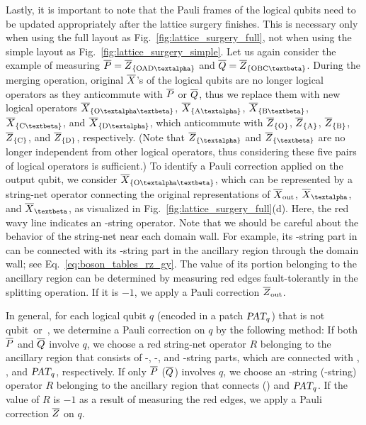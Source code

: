 \documentclass[
 prx,
 reprint,
 superscriptaddress,
 longbibliography,
 dvipsnames
]{revtex4-2}
\begin{document}
Lastly, it is important to note that the Pauli frames of the logical qubits need to be updated appropriately after the lattice surgery finishes.
This is necessary only when using the full layout as Fig.~\ref{fig:lattice_surgery_full}, not when using the simple layout as Fig.~\ref{fig:lattice_surgery_simple}.
Let us again consider the example of measuring $\lgc{P} = \lgztp{OAD\talpha}$ and $\lgc{Q} = \lgztp{OBC\tbeta}$.
During the merging operation, original $\overline{X}$'s of the logical qubits are no longer logical operators as they anticommute with $\overline{P}$ or $\overline{Q}$, thus we replace them with new logical operators $\lgxtp{O\textalpha\textbeta}$, $\lgxtp{A\talpha}$, $\lgxtp{B\tbeta}$, $\lgxtp{C\tbeta}$, and $\lgxtp{D\talpha}$, which anticommute with $\overline{Z}_\qty{\text{O}}$, $\overline{Z}_\qty{\text{A}}$, $\overline{Z}_\qty{\text{B}}$, $\overline{Z}_\qty{\text{C}}$, and $\overline{Z}_\qty{\text{D}}$, respectively.
(Note that $\lgztp{\talpha}$ and $\lgztp{\tbeta}$ are no longer independent from other logical operators, thus considering these five pairs of logical operators is sufficient.)
To identify a Pauli correction applied on the output qubit, we consider $\lgxtp{O\textalpha\textbeta}$, which can be represented by a string-net operator connecting the original representations of $\overline{X}_{\mathrm{out}}$, $\lgxalpha$, and $\lgxbeta$, as visualized in Fig.~\ref{fig:lattice_surgery_full}(d).
Here, the red wavy line indicates an \ry-string operator.
Note that we should be careful about the behavior of the string-net near each domain wall.
For example, its \rx-string part in \patchout can be connected with its \ry-string part in the ancillary region through the domain wall; see Eq.~\eqref{eq:boson_tables_rz_gy}.
The value of its portion belonging to the ancillary region can be determined by measuring red edges fault-tolerantly in the splitting operation.
If it is $-1$, we apply a Pauli correction $\overline{Z}_{\mathrm{out}}$.

In general, for each logical qubit $q$ (encoded in a patch $\textsl{PAT}_q$) that is not qubit~\talpha or~\tbeta, we determine a Pauli correction on $q$ by the following method:
If both $\overline{P}$ and $\overline{Q}$ involve $q$, we choose a red string-net operator $R$ belonging to the ancillary region that consists of \rz-, \rx-, and \ry-string parts, which are connected with \patchalpha, \patchbeta, and $\textsl{PAT}_q$, respectively.
If only $\overline{P}$ ($\overline{Q}$) involves $q$, we choose an \rz-string (\rx-string) operator $R$ belonging to the ancillary region that connects \patchalpha (\patchbeta) and $\textsl{PAT}_q$.
If the value of $R$ is $-1$ as a result of measuring the red edges, we apply a Pauli correction $\overline{Z}$ on $q$.
\end{document}
